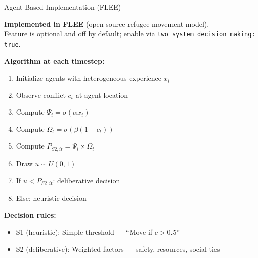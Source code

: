 \documentclass[aspectratio=169]{beamer}
\begin{document}
\begin{frame}{Agent-Based Implementation (FLEE)}

\textbf{Implemented in FLEE} (open-source refugee movement model).\\
Feature is \alert{optional and off by default}; enable via \texttt{two\_system\_decision\_making: true}.

\vspace{0.5em}

\textbf{Algorithm at each timestep:}

\begin{enumerate}
    \item Initialize agents with heterogeneous experience $x_i$
    \item Observe conflict $c_t$ at agent location
    \item Compute $\Psi_i = \sigma(\alpha x_i)$
    \item Compute $\Omega_t = \sigma(\beta(1 - c_t))$
    \item Compute $P_{S2,it} = \Psi_i \times \Omega_t$
    \item Draw $u \sim U(0,1)$
    \item If $u < P_{S2,it}$: deliberative decision
    \item Else: heuristic decision
\end{enumerate}

\textbf{Decision rules:}
\begin{itemize}
    \item S1 (heuristic): Simple threshold — ``Move if $c > 0.5$''
    \item S2 (deliberative): Weighted factors — safety, resources, social ties
\end{itemize}

\end{frame}
\end{document}
